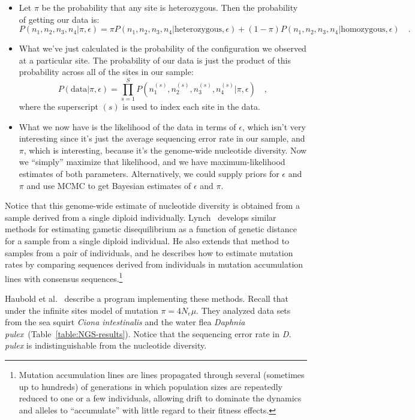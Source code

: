 \begin{itemize}
\item Let $\pi$ be the probability that any site is heterozygous. Then
  the probability of getting our data is:
{\footnotesize
\[
P(n_1,n_2,n_3,n_4|\pi,\epsilon)
=
\pi P(n_1,n_2,n_3,n_4|\mbox{heterozygous},\epsilon)
+
(1-\pi)P(n_1,n_2,n_3,n_4|\mbox{homozygous},\epsilon) \quad .
\]
}

\item What we've just calculated is the probability of the
  configuration we observed at a particular site. The probability of
  our data is just the product of this probability across all of the
  sites in our sample:
\[
P(\mbox{data}|\pi,\epsilon) = \prod_{s=1}^S
P(n_1^{(s)},n_2^{(s)},n_3^{(s)},n_4^{(s)}|\pi,\epsilon) \quad ,
\]
where the superscript $(s)$ is used to index each site in the data.

\item What we now have is the likelihood of the data in terms of
  $\epsilon$, which isn't very interesting since it's just the average
  sequencing error rate in our sample, and $\pi$, which is
  interesting, because it's the genome-wide nucleotide diversity. Now
  we ``simply'' maximize that likelihood, and we have
  maximum-likelihood estimates of both parameters. Alternatively, we
  could supply priors for $\epsilon$ and $\pi$ and use MCMC to get
  Bayesian estimates of $\epsilon$ and $\pi$.  

\end{itemize}

Notice that this genome-wide estimate of nucleotide diversity is
obtained from a sample derived from a single diploid
individually. Lynch~\cite{Lynch-2008} develops similar methods for
estimating gametic disequilibrium as a function of genetic distance
for a sample from a single diploid individual. He also extends that
method to samples from a pair of individuals, and he describes how to
estimate mutation rates by comparing sequences derived from
individuals in mutation accumulation lines with consensus
sequences.\footnote{Mutation accumulation lines are lines propagated
  through several (sometimes up to hundreds) of generations in which
  population sizes are repeatedly reduced to one or a few individuals,
  allowing drift to dominate the dynamics and alleles to
  ``accumulate'' with little regard to their fitness effects.}

Haubold et al.~\cite{Haubold-etal-2010} describe a program
implementing these methods. Recall that under the infinite sites model
of mutation $\pi = 4N_e\mu$. They analyzed data sets from the sea
squirt {\it Ciona intestinalis\/} and the water flea {\it Daphnia
  pulex}~(Table~\ref{table:NGS-results}). Notice that the sequencing
error rate in {\it D. pulex} is indistinguishable from the nucleotide
diversity.

